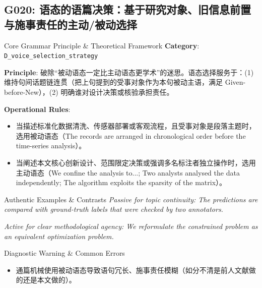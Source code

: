 \subsection{G020: 语态的语篇决策：基于研究对象、旧信息前置与施事责任的主动/被动选择}\label{sec:rule:G020}
\begin{ConceptBox}{Core Grammar Principle \& Theoretical Framework}
\textbf{Category}: \texttt{D\_voice\_selection\_strategy}\par\vspace{3pt}
\textbf{Principle}: 破除“被动语态一定比主动语态更学术”的迷思。语态选择服务于：(1) 维持句间话题链连贯（把上句提到的受事对象作为本句被动主语，满足 Given-before-New），(2) 明确谁对设计决策或核验承担责任。\par\vspace{4pt}
\textbf{Operational Rules}:
\begin{itemize}[leftmargin=1.5em, itemsep=1pt]
  \item 当描述标准化数据清洗、传感器部署或客观流程，且受事对象是段落主题时，选用被动语态（The records are arranged in chronological order before the time-series analysis）。
  \item 当阐述本文核心创新设计、范围限定决策或强调多名标注者独立操作时，选用主动语态（We confine the analysis to...; Two analysts analysed the data independently; The algorithm exploits the sparsity of the matrix）。
\end{itemize}
\end{ConceptBox}
\begin{ExampleBox}{Authentic Examples \& Contrasts}
\textit{Passive for topic continuity: The predictions are compared with ground-truth labels that were checked by two annotators.}\par\vspace{2pt}
\textit{Active for clear methodological agency: We reformulate the constrained problem as an equivalent optimization problem.}\par\vspace{2pt}
\end{ExampleBox}
\begin{TipBox}{Diagnostic Warning \& Common Errors}
\begin{itemize}[leftmargin=1.5em, itemsep=1pt]
  \item 通篇机械使用被动语态导致语句冗长、施事责任模糊（如分不清是前人文献做的还是本文做的）。
\end{itemize}
\end{TipBox}
\vspace{6pt}
